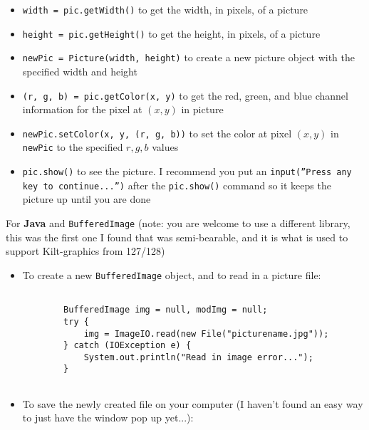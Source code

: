 \documentclass{article}
\begin{document}
\begin{itemize}
\begin{itemize}
              \item \texttt{width = pic.getWidth()} to get the width, in pixels, of a picture

              \item \texttt{height = pic.getHeight()} to get the height, in pixels, of a picture

              \item \texttt{newPic = Picture(width, height)} to create a new picture object with the specified width and height

              \item \texttt{(r, g, b) = pic.getColor(x, y)} to get the red, green, and blue channel information for the pixel at $(x, y)$ in picture

              \item \texttt{newPic.setColor(x, y, (r, g, b))} to set the color at pixel $(x, y)$ in \texttt{newPic} to the specified $r, g, b$ values

              \item \texttt{pic.show()} to see the picture.  I recommend you put an \texttt{input(”Press any key to continue...”)} after the \texttt{pic.show()} command so it keeps the picture up until you are done

          \end{itemize}

          \hrulefill

          \vspace{5mm}

          For \textbf{Java} and \texttt{BufferedImage} (note: you are welcome to use a different library, this was the first one I found that was semi-bearable, and it is what is used to support Kilt-graphics from 127/128)

          \begin{itemize}

              \item To create a new \texttt{BufferedImage} object, and to read in a picture file:
                    \begin{verbatim}
        
        BufferedImage img = null, modImg = null;
        try {
            img = ImageIO.read(new File("picturename.jpg"));
        } catch (IOException e) {
            System.out.println("Read in image error...");
        }
        
\end{verbatim}


              \item To save the newly created file on your computer (I haven’t found an easy way to just have the window pop up yet...):


\end{itemize}
\end{itemize}
\end{document}
